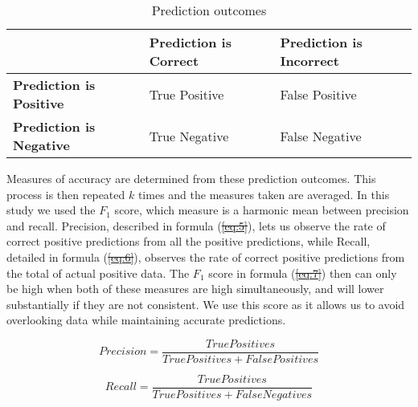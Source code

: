 \documentclass[review]{elsarticle}
\providecommand{\DIFaddtex}[1]{{\protect\color{blue}\uwave{#1}}} %
\providecommand{\DIFdeltex}[1]{{\protect\color{red}\sout{#1}}}                      %
\providecommand{\DIFaddbegin}{} %
\providecommand{\DIFaddend}{} %
\providecommand{\DIFdelbegin}{} %
\providecommand{\DIFdelend}{} %
\providecommand{\DIFaddbeginFL}{} %
\providecommand{\DIFaddendFL}{} %
\providecommand{\DIFdelendFL}{} %
\providecommand{\DIFadd}[1]{\texorpdfstring{\DIFaddtex{#1}}{#1}} %
\providecommand{\DIFdel}[1]{\texorpdfstring{\DIFdeltex{#1}}{}} %
\newcommand{\DIFscaledelfig}{0.5}
\newlength{\DIFdelgraphicswidth} %
\newlength{\DIFdelgraphicsheight} %
\newcommand{\DIFaddincludegraphics}[2][]{{\color{blue}\fbox{\DIFOincludegraphics[#1]{#2}}}} %
\newcommand{\DIFdelincludegraphics}[2][]{%
\sbox{\DIFdelgraphicsbox}{\DIFOincludegraphics[#1]{#2}}%
\settoboxwidth{\DIFdelgraphicswidth}{\DIFdelgraphicsbox} %
\settoboxtotalheight{\DIFdelgraphicsheight}{\DIFdelgraphicsbox} %
\scalebox{\DIFscaledelfig}{%
\parbox[b]{\DIFdelgraphicswidth}{\usebox{\DIFdelgraphicsbox}\\[-\baselineskip] \rule{\DIFdelgraphicswidth}{0em}}\llap{\resizebox{\DIFdelgraphicswidth}{\DIFdelgraphicsheight}{%
\setlength{\unitlength}{\DIFdelgraphicswidth}%
\begin{picture}(1,1)%
\thicklines\linethickness{2pt} %
{\color[rgb]{1,0,0}\put(0,0){\framebox(1,1){}}}%
{\color[rgb]{1,0,0}\put(0,0){\line( 1,1){1}}}%
{\color[rgb]{1,0,0}\put(0,1){\line(1,-1){1}}}%
\end{picture}%
}\hspace*{3pt}}} %
} %
\DeclareRobustCommand{\DIFaddbegin}{\DIFOaddbegin \let\includegraphics\DIFaddincludegraphics} %
\DeclareRobustCommand{\DIFaddend}{\DIFOaddend \let\includegraphics\DIFOincludegraphics} %
\DeclareRobustCommand{\DIFdelbegin}{\DIFOdelbegin \let\includegraphics\DIFdelincludegraphics} %
\DeclareRobustCommand{\DIFdelend}{\DIFOaddend \let\includegraphics\DIFOincludegraphics} %
\DeclareRobustCommand{\DIFaddbeginFL}{\DIFOaddbeginFL \let\includegraphics\DIFaddincludegraphics} %
\DeclareRobustCommand{\DIFaddendFL}{\DIFOaddendFL \let\includegraphics\DIFOincludegraphics} %
\DeclareRobustCommand{\DIFdelendFL}{\DIFOaddendFL \let\includegraphics\DIFOincludegraphics} %
\begin{document}
\DIFdelbegin %
\DIFdelendFL \DIFaddbeginFL \begin{table}[htp] \DIFaddendFL \centering
\caption{Prediction outcomes}\label{tab:preds}
\begin{tabular}{|>{\centering\arraybackslash}m{7em}|>{\centering\arraybackslash}m{7em}|>{\centering\arraybackslash}m{7em}|} \arrayrulecolor{white}\hline %
\multicolumn{1}{c|}{} & \cellcolor{Mustard}\textbf{Prediction is Correct} & \cellcolor{LightPlum}\textbf{Prediction is Incorrect} \\ \hline
\cellcolor{DarkBlue}\textbf{Prediction is Positive} & \cellcolor{DeepGreen}True Positive & \cellcolor{DeepPurple}False Positive \\ \hline
\cellcolor{DeepSalmon}\textbf{Prediction is Negative} & \cellcolor{orange}True Negative & \cellcolor{Plum}False Negative \\ \hline
\end{tabular}
\end{table}

Measures of accuracy are determined from these prediction outcomes. This process is then repeated \(k\) times and the measures taken are averaged. In this study we used the \(F_{1}\) score, which measure is a harmonic mean between precision and recall. Precision, described in formula (\DIFdelbegin \DIFdel{\ref{eq:5}}\DIFdelend \DIFaddbegin \DIFadd{\ref{eq:6}}\DIFaddend ), lets us observe the rate of correct positive predictions from all the positive predictions, while Recall, detailed in formula (\DIFdelbegin \DIFdel{\ref{eq:6}}\DIFdelend \DIFaddbegin \DIFadd{\ref{eq:7}}\DIFaddend ), observes the rate of correct positive predictions from the total of actual positive data. The \(F_{1}\) score in formula (\DIFdelbegin \DIFdel{\ref{eq:7}}\DIFdelend \DIFaddbegin \DIFadd{\ref{eq:8}}\DIFaddend ) then can only be high when both of these measures are high simultaneously, and will lower substantially if they are not consistent. We use this score as it allows us to avoid overlooking data while maintaining accurate predictions.

\begin{equation}\DIFdelbegin %
\DIFdelend \DIFaddbegin \label{eq:6}
\DIFaddend Precision = \frac{True Positives}{True Positives + False Positives}
\end{equation}

\begin{equation}\DIFdelbegin %
\DIFdelend \DIFaddbegin \label{eq:7}
\DIFaddend Recall = \frac{True Positives}{True Positives + False Negatives}
\end{equation}
\end{document}
